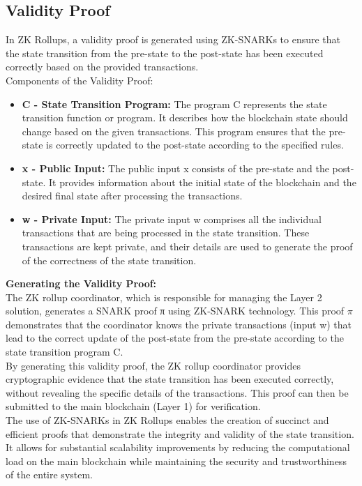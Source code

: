 \documentclass{report}
\begin{document}
\subsection{Validity Proof}
In ZK Rollups, a validity proof is generated using ZK-SNARKs to ensure that the state transition from the pre-state to the post-state has been executed correctly based on the provided transactions.\\
Components of the Validity Proof:\\
\begin{itemize}
	\item \textbf{C - State Transition Program:} The program C represents the state transition function or program. It describes how the blockchain state should change based on the given transactions. This program ensures that the pre-state is correctly updated to the post-state according to the specified rules.
	\item \textbf{x - Public Input:} The public input x consists of the pre-state and the post-state. It provides information about the initial state of the blockchain and the desired final state after processing the transactions.
	\item \textbf{w - Private Input:} The private input w comprises all the individual transactions that are being processed in the state transition. These transactions are kept private, and their details are used to generate the proof of the correctness of the state transition.
\end{itemize}
\textbf{Generating the Validity Proof:}\\
The ZK rollup coordinator, which is responsible for managing the Layer 2 solution, generates a SNARK proof π using ZK-SNARK technology. This proof $\pi$ demonstrates that the coordinator knows the private transactions (input w) that lead to the correct update of the post-state from the pre-state according to the state transition program C.\\
By generating this validity proof, the ZK rollup coordinator provides cryptographic evidence that the state transition has been executed correctly, without revealing the specific details of the transactions. This proof can then be submitted to the main blockchain (Layer 1) for verification.\\
The use of ZK-SNARKs in ZK Rollups enables the creation of succinct and efficient proofs that demonstrate the integrity and validity of the state transition. It allows for substantial scalability improvements by reducing the computational load on the main blockchain while maintaining the security and trustworthiness of the entire system.
\end{document}
